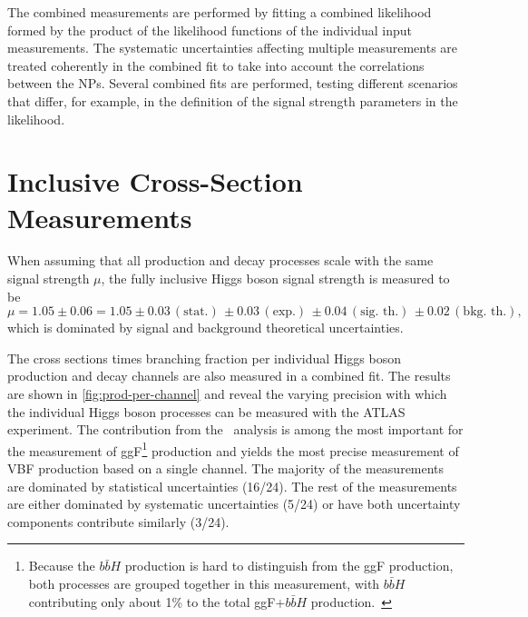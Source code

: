 The combined measurements are performed by fitting a combined likelihood formed by the product of the likelihood functions of the individual input measurements. 
The systematic uncertainties affecting multiple measurements are treated coherently in the combined fit to take into account the correlations between the NPs. 
Several combined fits are performed, testing different scenarios that differ, for example, in the definition of the signal strength parameters in the likelihood.


\section{Inclusive Cross-Section Measurements}
When assuming that all production and decay processes scale with the same signal strength $\mu$, the fully inclusive Higgs boson signal strength is measured to be 
\begin{equation*}
   \mu =1.05 \pm 0.06 = 1.05\pm 0.03\, (\text{stat.})\, \pm 0.03\, (\text{exp.})\, \pm 0.04\, (\text{sig.\ th.})\, \pm 0.02\, (\text{bkg.\ th.}),
\end{equation*}
which is dominated by signal and background theoretical uncertainties. 

The cross sections times branching fraction per individual Higgs boson production and decay channels are also measured in a combined fit.
The results are shown in \cref{fig:prod-per-channel} and reveal the varying precision with which the individual Higgs boson processes can be measured with the ATLAS experiment.
The contribution from the \HWW\ analysis is among the most important for the measurement of ggF\footnote{Because the $b\bar{b}H$ production is hard to distinguish from the ggF production, both processes are grouped together in this measurement, with $b\bar{b}H$ contributing only about 1\% to the total ggF+$b\bar{b}H$ production.~\cite{NaturePaper}} production and yields the most precise measurement of VBF production based on a single channel. 
The majority of the measurements are dominated by statistical uncertainties (16/24). The rest of the measurements are either dominated by systematic uncertainties (5/24) or have both uncertainty components contribute similarly (3/24). 

